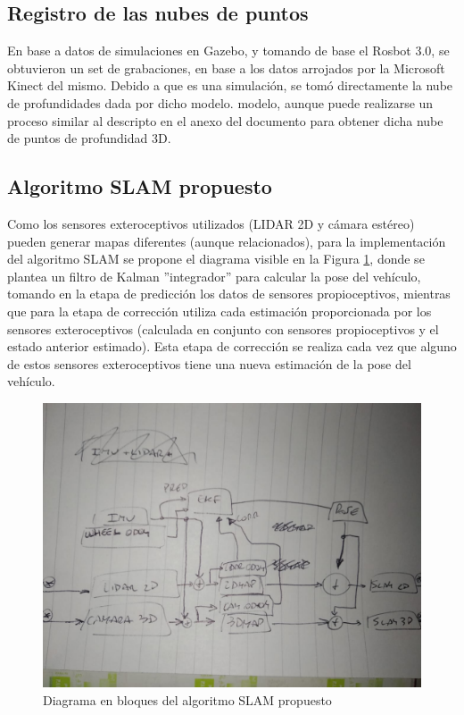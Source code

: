 \subsection{Registro de las nubes de puntos}
En base a datos de simulaciones en Gazebo, y tomando de base el Rosbot 3.0, se obtuvieron un set de grabaciones, en base a los datos arrojados por la Microsoft Kinect del mismo. Debido a que es una simulación, se tomó directamente la nube de profundidades dada por dicho 
\ifimagenespaper
modelo.
\else
modelo, aunque puede realizarse un proceso similar al descripto en el anexo del documento para obtener dicha nube de puntos de profundidad 3D.
\fi

\else
\subsection{Algoritmo SLAM propuesto}
Como los sensores exteroceptivos utilizados (LIDAR 2D y cámara estéreo) pueden generar mapas diferentes (aunque relacionados), para la implementación del algoritmo SLAM se propone el diagrama visible en la Figura \ref{fig:slamalgorithmblockdiagram}, donde se plantea un filtro de Kalman ''integrador'' para calcular la pose del vehículo, tomando en la etapa de predicción los datos de sensores propioceptivos, mientras que para la etapa de corrección utiliza cada estimación proporcionada por los sensores exteroceptivos (calculada en conjunto con sensores propioceptivos y el estado anterior estimado). Esta etapa de corrección se realiza cada vez que alguno de estos sensores exteroceptivos tiene una nueva estimación de la pose del vehículo.
\begin{figure}
    \centering
    \includegraphics[width=\textwidth]{Img/SLAMAlgorithmBlockDiagram.jpeg}
    \caption{Diagrama en bloques del algoritmo SLAM propuesto}
    \label{fig:slamalgorithmblockdiagram}
\end{figure}

